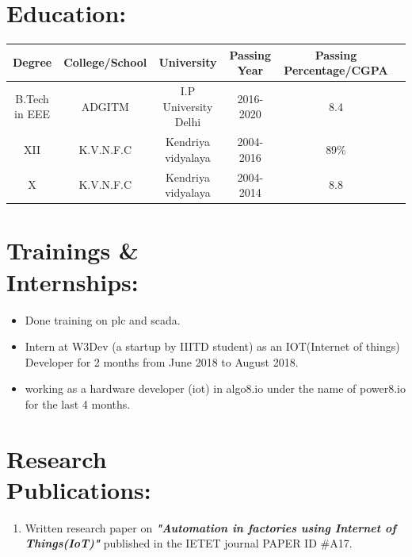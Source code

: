 \documentclass[10pt]{report}
\begin{document}
\section*{Education:}
\begin{center}
	\begin{tabular}{|c|c|c|c|c|c|}
		\hline
		\hspace{2pt}\large\textbf{Degree} \hspace{2pt} & \hspace{2pt}\large\textbf{College/School}\hspace{2pt} &\hspace{2pt} \large\textbf{University}\hspace{2pt} &\hspace{2pt}\large\textbf{Passing Year}\hspace{2pt} & \hspace{2pt}\large\textbf{Passing Percentage/CGPA}\hspace{2pt}\\
		\hline
		B.Tech in EEE & ADGITM & I.P University Delhi & 2016-2020 & 8.4 \\
		XII & K.V.N.F.C & Kendriya vidyalaya & 2004-2016 & 89\%\\
		X & K.V.N.F.C & Kendriya vidyalaya & 2004-2014 & 8.8\\ 
		\hline
	\end{tabular}
\end{center}

\section*{Trainings \&\\ Internships:}
\begin{itemize}
	\item Done training on plc and scada.
	\item Intern at W3Dev (a startup by IIITD student) as an IOT(Internet of things) Developer for 2 months from June 2018 to August 2018.
	\item working as a hardware developer (iot) in algo8.io under the name of power8.io for the last 4 months.
\end{itemize}
\section*{Research \\Publications:}
\begin{enumerate}
	\item Written research paper on \textbf{\textit{"Automation in factories using Internet of Things(IoT)"}} published in the IETET journal   PAPER ID \#A17.
\end{enumerate}
\end{document}
